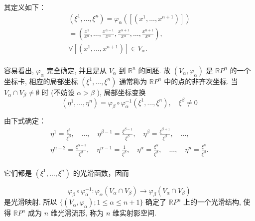 其定义如下：
$$
\begin{array}{l} (\xi^ {1}, \dots , \xi^ {n}) = \varphi_ {\alpha} ([ (x ^ {1}, \dots , x ^ {n + 1}) ]) \\ = \left(\frac {x ^ {1}}{x ^ {\alpha}}, \dots , \frac {x ^ {\alpha - 1}}{x ^ {\alpha}}, \frac {x ^ {\alpha + 1}}{x ^ {\alpha}}, \dots , \frac {x ^ {n + 1}}{x ^ {\alpha}}\right), \\ \forall [ (x ^ {1}, \dots , x ^ {n + 1}) ] \in V _ {\alpha}. \\ \end{array}
$$

容易看出,  $\varphi_{\alpha}$  完全确定, 并且是从  $V_{\alpha}$  到  $\mathbb{R}^{n}$  的同胚. 故  $(V_{\alpha}, \varphi_{\alpha})$  是  $\mathbb{R}P^{n}$  的一个坐标卡, 相应的局部坐标  $(\xi^{1}, \dots, \xi^{n})$  通常称为  $\mathbb{R}P^{n}$  中的点的非齐次坐标. 当  $V_{\alpha} \cap V_{\beta} \neq \emptyset$  时 (不妨设  $\alpha > \beta$ ), 局部坐标变换
$$
(\eta^ {1}, \dots , \eta^ {n}) = \varphi_ {\beta} \circ \varphi_ {\alpha} ^ {- 1} (\xi^ {1}, \dots , \xi^ {n}), \quad \xi^ {\beta} \neq 0
$$

由下式确定：
$$
\begin{array}{l} \eta^ {1} = \frac {\xi^ {1}}{\xi^ {\beta}}, \quad \dots , \quad \eta^ {\beta - 1} = \frac {\xi^ {\beta - 1}}{\xi^ {\beta}}, \quad \eta^ {\beta} = \frac {\xi^ {\beta + 1}}{\xi^ {\beta}}, \quad \dots , \\ \eta^ {\alpha - 2} = \frac {\xi^ {\alpha - 1}}{\xi^ {\beta}}, \quad \eta^ {\alpha - 1} = \frac {1}{\xi^ {\beta}}, \quad \eta^ {\alpha} = \frac {\xi^ {\alpha}}{\xi^ {\beta}}, \quad \dots , \quad \eta^ {n} = \frac {\xi^ {n}}{\xi^ {\beta}}. \\ \end{array}
$$

它们都是  $(\xi^{1},\dots ,\xi^{n})$  的光滑函数，因而

$$
\varphi_ {\beta} \circ \varphi_ {\alpha} ^ {- 1}: \varphi_ {\alpha} (V _ {\alpha} \cap V _ {\beta}) \rightarrow \varphi_ {\beta} (V _ {\alpha} \cap V _ {\beta})
$$
是光滑映射. 所以  $\{(V_{\alpha}, \varphi_{\alpha}); 1 \leqslant \alpha \leqslant n + 1\}$  确定了  $\mathbb{R}P^{n}$  上的一个光滑结构, 使得  $\mathbb{R}P^{n}$  成为  $n$  维光滑流形, 称为  $n$  维实射影空间.

\section{}




